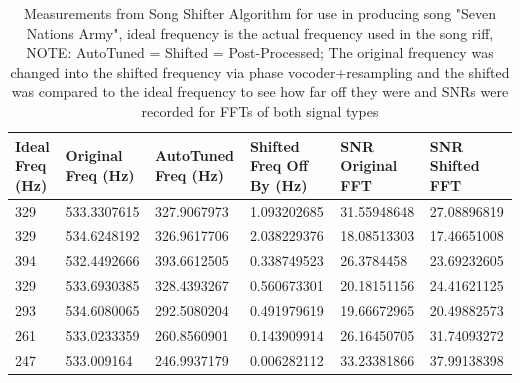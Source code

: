 \documentclass{article}
\begin{document}
    \begin{table}[H]
        \centering
        \caption{Measurements from Song Shifter Algorithm for use in producing song "Seven Nations Army", ideal frequency is the actual frequency used in the song riff, NOTE: AutoTuned = Shifted = Post-Processed; The original frequency was changed into the shifted frequency via phase vocoder+resampling and the shifted was compared to the ideal frequency to see how far off they were and SNRs were recorded for FFTs of both signal types}
        \label{my-label}
        \begin{adjustbox}{max width=\textwidth}
        \begin{tabular}{llllll}
        \hline
        \textbf{Ideal Freq (Hz)} & \textbf{Original Freq (Hz)} & \textbf{AutoTuned Freq (Hz)} & \textbf{Shifted Freq Off By (Hz)} & \textbf{SNR Original FFT} & \textbf{SNR Shifted FFT} \\ \hline
        329 & 533.3307615 & 327.9067973 & 1.093202685 & 31.55948648 & 27.08896819 \\
        329 & 534.6248192 & 326.9617706 & 2.038229376 & 18.08513303 & 17.46651008 \\
        394 & 532.4492666 & 393.6612505 & 0.338749523 & 26.3784458 & 23.69232605 \\
        329 & 533.6930385 & 328.4393267 & 0.560673301 & 20.18151156 & 24.41621125 \\
        293 & 534.6080065 & 292.5080204 & 0.491979619 & 19.66672965 & 20.49882573 \\
        261 & 533.0233359 & 260.8560901 & 0.143909914 & 26.16450705 & 31.74093272 \\
        247 & 533.009164 & 246.9937179 & 0.006282112 & 33.23381866 & 37.99138398 \\ \hline
        \end{tabular}
        \end{adjustbox}
        \end{table}
\end{document}
